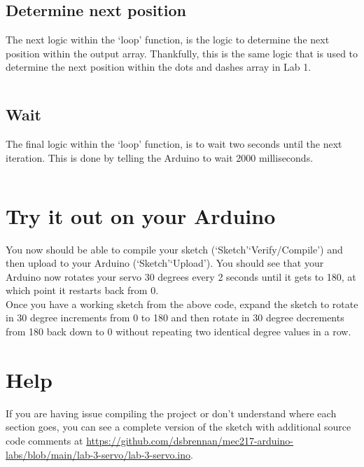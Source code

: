\documentclass[11pt,a4paper]{article}
\begin{document}
\vspace{-1.75em}
\inputminted{arduino}{./src/6-loop-write.txt}
\vspace{-.5em}

\subsection{Determine next position}
The next logic within the `loop' function, is the logic to determine the next position within the output array. Thankfully, this is the same logic that is used to determine the next position within the dots and dashes array in Lab 1.\\

\vspace{-1.75em}
\inputminted{arduino}{./src/7-loop-next.txt}
\vspace{-.5em}

\subsection{Wait}
The final logic within the `loop' function, is to wait two seconds until the next iteration. This is done by telling the Arduino to wait 2000 milliseconds.\\

\vspace{-1.75em}
\inputminted{arduino}{./src/8-loop-sleep.txt}
\vspace{-2em}

\section*{Try it out on your Arduino}
You now should be able to compile your sketch (`Sketch'\textrightarrow `Verify/Compile') and then upload to your Arduino (`Sketch'\textrightarrow `Upload'). You should see that your Arduino now rotates your servo 30 degrees every 2 seconds until it gets to 180, at which point it restarts back from 0.\\

\noindent
Once you have a working sketch from the above code, expand the sketch to rotate in 30 degree increments from 0 to 180 and then rotate in 30 degree decrements from 180 back down to 0 without repeating two identical degree values in a row.

\section*{Help}
If you are having issue compiling the project or don't understand where each section goes, you can see a complete version of the sketch with additional source code comments at \url{https://github.com/dsbrennan/mec217-arduino-labs/blob/main/lab-3-servo/lab-3-servo.ino}.

\vspace{2em}

\begin{center}
\end{center}
\end{document}
